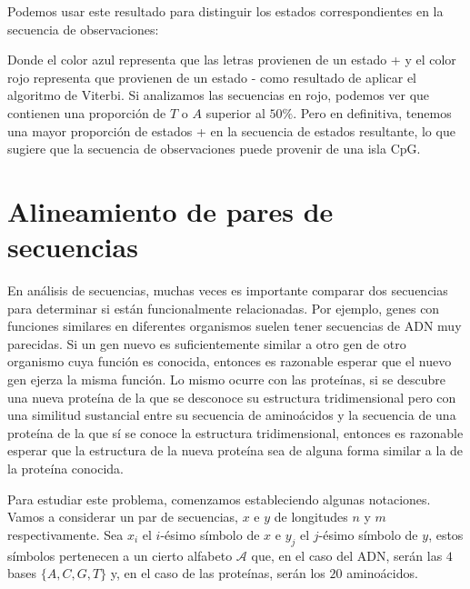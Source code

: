 Podemos usar este resultado para distinguir los estados correspondientes en la secuencia de observaciones:

\textcolor{blue}{}\textcolor{red}{}\textcolor{blue}{}\textcolor{red}{}\textcolor{blue}{}\textcolor{red}{}\textcolor{blue}{}\textcolor{red}{}\textcolor{blue}{}\textcolor{red}{}\textcolor{blue}{}

Donde el color azul representa que las letras provienen de un estado + y el color rojo representa que provienen de un estado - como resultado de aplicar el algoritmo de Viterbi. Si analizamos las secuencias en rojo, podemos ver que contienen una proporción de $T$ o $A$ superior al $50\%$. Pero en definitiva, tenemos una mayor proporción de estados + en la secuencia de estados resultante, lo que sugiere que la secuencia de observaciones puede provenir de una isla CpG.

\section{Alineamiento de pares de secuencias}
En análisis de secuencias, muchas veces es importante comparar dos secuencias para determinar si están funcionalmente relacionadas. Por ejemplo, genes con funciones similares en diferentes organismos suelen tener secuencias de ADN muy parecidas. Si un gen nuevo es suficientemente similar a otro gen de otro organismo cuya función es conocida, entonces es razonable esperar que el nuevo gen ejerza la misma función. Lo mismo ocurre con las proteínas, si se descubre una nueva proteína de la que se desconoce su estructura tridimensional pero con una similitud sustancial entre su secuencia de aminoácidos y la secuencia de una proteína de la que sí se conoce la estructura tridimensional, entonces es razonable esperar que la estructura de la nueva proteína sea de alguna forma similar a la de la proteína conocida.

Para estudiar este problema, comenzamos estableciendo algunas notaciones. Vamos a considerar un par de secuencias, $x$ e $y$ de longitudes $n$ y $m$ respectivamente. Sea $x_i$ el $i$-ésimo símbolo de $x$ e $y_j$ el $j$-ésimo símbolo de $y$, estos símbolos pertenecen a un cierto alfabeto $\mathcal{A}$ que, en el caso del ADN, serán las $4$ bases $\{A,C,G,T\}$ y, en el caso de las proteínas, serán los $20$ aminoácidos.


